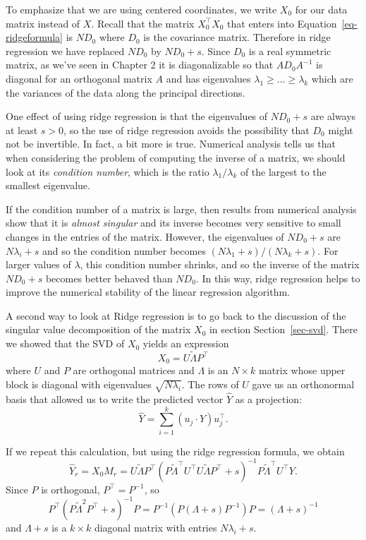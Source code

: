 \documentclass[
  11pt,
  letterpaper,
]{scrbook}
\theoremstyle{plain}
\theoremstyle{plain}
\theoremstyle{remark}
\begin{document}
To emphasize that we are using centered coordinates, we write \(X_{0}\)
for our data matrix instead of \(X\). Recall that the matrix
\(X_0^{\intercal}X_0\) that enters into Equation~\ref{eq-ridgeformula}
is \(ND_{0}\) where \(D_{0}\) is the covariance matrix. Therefore in
ridge regression we have replaced \(ND_0\) by \(ND_0+s\). Since \(D_0\)
is a real symmetric matrix, as we've seen in Chapter 2 it is
diagonalizable so that \(AD_0A^{-1}\) is diagonal for an orthogonal
matrix \(A\) and has eigenvalues \(\lambda_1\ge \ldots\ge \lambda_k\)
which are the variances of the data along the principal directions.

One effect of using ridge regression is that the eigenvalues of
\(ND_{0}+s\) are always at least \(s>0\), so the use of ridge regression
avoids the possibility that \(D_{0}\) might not be invertible. In fact,
a bit more is true. Numerical analysis tells us that when considering
the problem of computing the inverse of a matrix, we should look at its
\emph{condition number}, which is the ratio \(\lambda_1/\lambda_k\) of
the largest to the smallest eigenvalue.

If the condition number of a matrix is large, then results from
numerical analysis show that it is \emph{almost singular} and its
inverse becomes very sensitive to small changes in the entries of the
matrix. However, the eigenvalues of \(ND_0+s\) are \(N\lambda_{i}+s\)
and so the condition number becomes \((N\lambda_1+s)/(N\lambda_k+s)\).
For larger values of \(\lambda\), this condition number shrinks, and so
the inverse of the matrix \(ND_0+s\) becomes better behaved than
\(ND_{0}\). In this way, ridge regression helps to improve the numerical
stability of the linear regression algorithm.

A second way to look at Ridge regression is to go back to the discussion
of the singular value decomposition of the matrix \(X_{0}\) in section
Section~\ref{sec-svd}. There we showed that the SVD of \(X_{0}\) yields
an expression \[
X_{0}=U\tilde{\Lambda}P^{\intercal}
\] where \(U\) and \(P\) are orthogonal matrices and \(\Lambda\) is an
\(N\times k\) matrix whose upper block is diagonal with eigenvalues
\(\sqrt{N\lambda_{i}}\). The rows of \(U\) gave us an orthonormal basis
that allowed us to write the predicted vector \(\hat{Y}\) as a
projection: \[
\hat{Y}=\sum_{i=1}^{k} (u_j\cdot Y)u_{j}^{\intercal}.
\]

If we repeat this calculation, but using the ridge regression formula,
we obtain \[
\hat{Y}_{r}=X_{0}M_r = U\tilde{\Lambda}P^{\intercal}(P\tilde{\Lambda}^{\intercal}U^{\intercal}U\tilde{\Lambda}P^{\intercal}+s)^{-1}P\tilde{\Lambda}^{\intercal}U^{\intercal}Y.
\] Since \(P\) is orthogonal, \(P^{\intercal}=P^{-1}\), so \[
P^{\intercal}(P\tilde{\Lambda}^2P^{\intercal}+s)^{-1}P=P^{-1}(P(\Lambda+s)P^{-1})P=(\Lambda+s)^{-1}
\] and \(\Lambda+s\) is a \(k\times k\) diagonal matrix with entries
\(N\lambda_{i}+s\).
\end{document}
